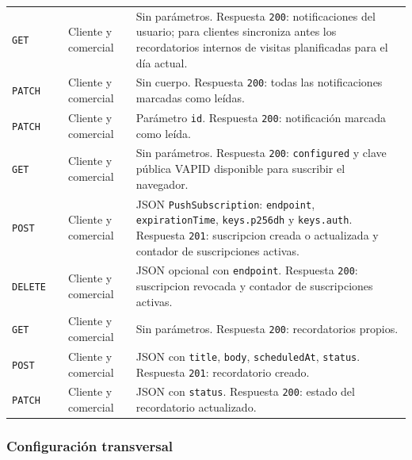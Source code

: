 {\begin{longtable}{A{0.10\textwidth}A{0.27\textwidth}A{0.15\textwidth}A{0.38\textwidth}}
\texttt{GET} &  & Cliente y comercial & Sin parámetros. Respuesta \texttt{200}: notificaciones del usuario; para clientes sincroniza antes los recordatorios internos de visitas planificadas para el día actual.\\
\texttt{PATCH} &  & Cliente y comercial & Sin cuerpo. Respuesta \texttt{200}: todas las notificaciones marcadas como leídas.\\
\texttt{PATCH} &  & Cliente y comercial & Parámetro \texttt{id}. Respuesta \texttt{200}: notificación marcada como leída.\\
\texttt{GET} &  & Cliente y comercial & Sin parámetros. Respuesta \texttt{200}: \texttt{configured} y clave pública VAPID disponible para suscribir el navegador.\\
\texttt{POST} &  & Cliente y comercial & JSON \texttt{PushSubscription}: \texttt{endpoint}, \texttt{expirationTime}, \texttt{keys.p256dh} y \texttt{keys.auth}. Respuesta \texttt{201}: suscripcion creada o actualizada y contador de suscripciones activas.\\
\texttt{DELETE} &  & Cliente y comercial & JSON opcional con \texttt{endpoint}. Respuesta \texttt{200}: suscripcion revocada y contador de suscripciones activas.\\
\texttt{GET} &  & Cliente y comercial & Sin parámetros. Respuesta \texttt{200}: recordatorios propios.\\
\texttt{POST} &  & Cliente y comercial & JSON con \texttt{title}, \texttt{body}, \texttt{scheduledAt}, \texttt{status}. Respuesta \texttt{201}: recordatorio creado.\\
\texttt{PATCH} &  & Cliente y comercial & JSON con \texttt{status}. Respuesta \texttt{200}: estado del recordatorio actualizado.\\
\end{longtable}
}

\subsubsection{Configuración transversal}

